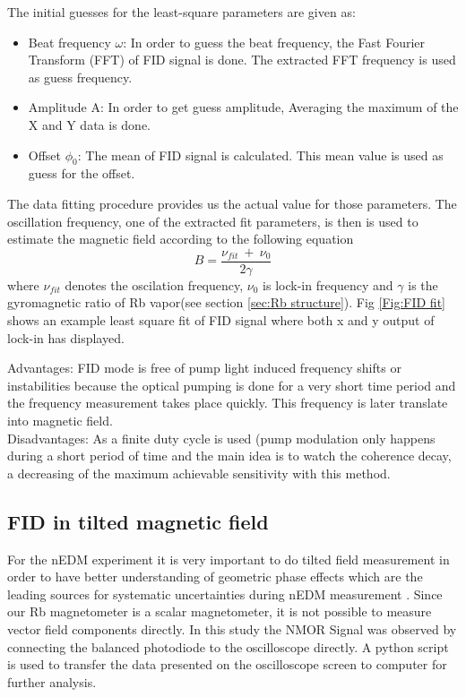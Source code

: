 The initial guesses for the least-square parameters are given
as:
\begin{itemize}
\item
Beat frequency $\omega$: In order to guess the beat frequency, the Fast Fourier Transform (FFT) of FID signal is done. The extracted FFT frequency is used as guess frequency.
\item
Amplitude A: In order to get guess amplitude, Averaging the maximum of the X and Y data is done.
\item
Offset $\phi_0$: The mean of FID signal is calculated. This mean value is used as guess for the offset. 

\end{itemize}
The data fitting procedure provides us the actual value for those parameters. The oscillation frequency, one of the extracted fit parameters, is then is used to estimate the magnetic field according to the following equation
\begin{equation}
 B= \frac{\nu_{fit}~ +~\nu_0}{2\gamma}\label{eq:field}
\end{equation}
 where $\nu_{fit}$ denotes the oscilation  frequency, $\nu_{0}$ is lock-in frequency and $\gamma$ is the gyromagnetic ratio of Rb vapor(see section \ref{sec:Rb structure}). Fig \ref{Fig:FID fit} shows an example least square fit of FID signal where both x and y output of lock-in has displayed.
 
Advantages: FID mode is free of  pump light induced frequency shifts or instabilities because the optical pumping is done for a very short time period and the frequency measurement takes place quickly. This frequency is later translate into magnetic field.\\ 

Disadvantages: As a finite duty cycle is used (pump modulation only happens during a short period of time and the main idea is to watch the coherence decay, a decreasing of the maximum achievable sensitivity with this method.



\subsection{FID in tilted magnetic field}
For the nEDM experiment it is very important to do tilted field measurement in order to have better understanding of  geometric phase effects which are the leading sources for systematic uncertainties during nEDM measurement . 
Since our Rb magnetometer is a scalar magnetometer, it is not possible to measure vector field components directly. In this study the NMOR Signal was observed by connecting the balanced photodiode to the oscilloscope directly. A python script is used to transfer the data presented on the oscilloscope screen to computer for further analysis. 

